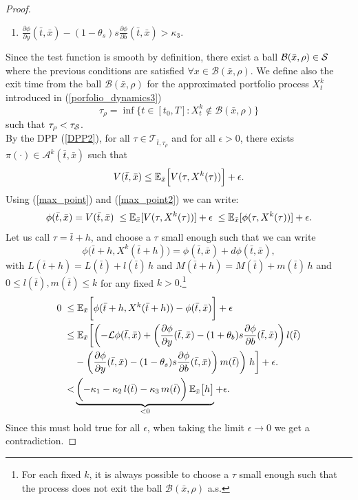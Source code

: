 \begin{proof}
\begin{enumerate}
 \item $\frac{\partial \phi}{\partial y}(\bar t, \bar x)-(1-\theta_s)s \frac{\partial \phi}{\partial b}(\bar t, \bar x) > \kappa_3.$
\end{enumerate}
Since the test function is smooth by definition, there exist a ball $\mathcal{B}(\bar x, \rho) \in \mathcal{S}$ 
where the previous conditions are satisfied $\forall x \in \mathcal{B}(\bar x, \rho)$. 
We define also the exit time from the ball $\mathcal{B}(\bar x, \rho)$ for the approximated portfolio process $X^{k}_t$ introduced in (\ref{porfolio_dynamics3})
\begin{equation}
 \tau_{\rho} = \inf \{ t \in [t_0,T] : X^{k}_t \not \in \mathcal{B}(\bar x, \rho) \}
\end{equation}
such that $\tau_{\rho} < \tau_{\mathcal{S}}$.\\

By the DPP (\ref{DPP2}), for all $\tau \in \mathcal{T}_{\bar t,\tau_{\rho}}$ and for all $\epsilon > 0$, there exists $\pi(\cdot) \in \mathcal{A}^k(\bar t,\bar x)$ such that
\begin{equation}
  V(\bar t, \bar x) \leq \mathbb{E}_{\bar x} \Bigl[ V(\tau, X^{k}(\tau)) \Bigr] +\epsilon.
\end{equation}
Using (\ref{max_point}) and (\ref{max_point2}) we can write:
\begin{equation*}
 \phi(\bar t, \bar x) = V(\bar t, \bar x) \; \leq \mathbb{E}_{\bar x}[V(\tau, X^{k}(\tau))] + \epsilon \; 
 \leq \mathbb{E}_{\bar x}[\phi(\tau, X^{k}(\tau))] + \epsilon.
\end{equation*}
Let us call $\tau = \bar t + h$, and choose a $\tau$ small enough such that we can write 
$$\phi \bigl( \bar t +h, X^{k}(\bar t+h)\bigr) = \phi(\bar t, \bar x) + d\phi(\bar t, \bar x), $$ 
with
$L(\bar t+h) = L(\bar t) + l(\bar t)\,h$ and $M(\bar t +h) = M(\bar t) + m(\bar t)\,h$ and $0 \leq l(\bar t),m(\bar t) \leq k$ for any fixed $k>0$.\footnote{For each fixed $k$, 
it is always possible to choose a $\tau$ small enough such that the process does not exit the ball $\mathcal{B}(\bar x, \rho)$ a.s.}
\begin{align}\label{first_inequality2}
 0 \; \leq & \; \mathbb{E}_{\bar x} \biggl[ \phi(\bar t +h, X^{k}(\bar t+h)) - \phi(\bar t, \bar x) \biggr] +\epsilon \\ \nonumber
   \leq & \; \mathbb{E}_{\bar x} \biggl[ \biggl( -\mathcal{L} \phi(\bar t, \bar x) + \left(\frac{\partial \phi}{\partial y}(\bar t, \bar x)
 -(1+\theta_b)s \frac{\partial \phi}{\partial b}(\bar t, \bar x)\right) l(\bar t) \\ \nonumber
   & - \left( \frac{\partial \phi}{\partial y}(\bar t, \bar x)-(1-\theta_s)s \frac{\partial \phi}{\partial b}(\bar t, \bar x) \right) m(\bar t) \biggr)\; h \biggr] + \epsilon.\\ \nonumber
   <& \underbrace{\biggl( -\kappa_1 - \kappa_2\, l(\bar t) - \kappa_3\, m(\bar t) \biggr) \, \mathbb{E}_{\bar x} \bigl[ h \bigr]}_{<0} + \epsilon. 
\end{align}
Since this must hold true for all $\epsilon$, when taking the limit $\epsilon \to 0$ we get a contradiction.
\end{proof}





